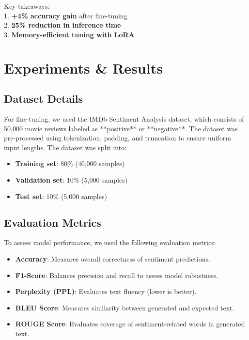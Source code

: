 \documentclass{article} %
\begin{document}
\begin{flushleft}
Key takeaways:
\\
1. \textbf{+4\% accuracy gain} after fine-tuning
\\
2.  \textbf{25\% reduction in inference time}
\\
3. \textbf{Memory-efficient tuning with LoRA}

\noindent 
\newline

\section{Experiments \& Results}

\subsection{Dataset Details}
For fine-tuning, we used the IMDb Sentiment Analysis dataset, which consists of 50,000 movie reviews labeled as **positive** or **negative**. The dataset was pre-processed using tokenization, padding, and truncation to ensure uniform input lengths. The dataset was split into:
\begin{itemize}
    \item \textbf{Training set}: 80\% (40,000 samples)
    \item \textbf{Validation set}: 10\% (5,000 samples)
    \item \textbf{Test set}: 10\% (5,000 samples)
\end{itemize}

\subsection{Evaluation Metrics}
To assess model performance, we used the following evaluation metrics:
\begin{itemize}
    \item \textbf{Accuracy}: Measures overall correctness of sentiment predictions.
    \item \textbf{F1-Score}: Balances precision and recall to assess model robustness.
    \item \textbf{Perplexity (PPL)}: Evaluates text fluency (lower is better).
    \item \textbf{BLEU Score}: Measures similarity between generated and expected text.
    \item \textbf{ROUGE Score}: Evaluates coverage of sentiment-related words in generated text.
\end{itemize}


\end{flushleft}
\end{document}
